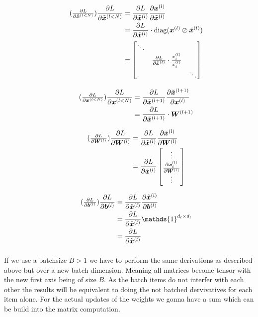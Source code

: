 \documentclass{article}
\newcommand\bM[1]{\ensuremath{\begin{bmatrix}#1\end{bmatrix}}}
\newcommand\·{\ensuremath{\cdot}}
\newcommand\…{\ensuremath{\dots}}
\renewcommand\t{\ensuremath{\times}}
\DeclareMathOperator{\diag}{diag}
\newcommand{\⇔}{\ensuremath{\Leftrightarrow}}
\newcommand{\⇐}{\ensuremath{\Leftarrow}}
\newcommand{\⇒}{\ensuremath{\Rightarrow}}
\newcommand\f[2]{\ensuremath{\frac{#1}{#2}}}
\newcommand\pf[2]{\ensuremath{\frac{\partial {#1}}{\partial {#2}}}}
\newcommand*{\B}[1]{\ifmmode\bm{#1}\else\textbf{#1}\fi}
\newcommand\1{\ensuremath{\mathds{1}}}
\newcommand\ℝ{\ensuremath{\mathds{R}}}
\begin{document}
\begin{align*}
  \tag{$\pf{L}{\tilde{\B{x}}^{(l<N)}}$}
  \pf{L}{\tilde{\B{x}}^{(l<N)}}
  &= \pf{L}{\tilde{\B{x}}^{(l)}}\pf{\B{x}^{(l)}}{\tilde{\B{x}}^{(l)}}\\
  &= \pf{L}{\tilde{\B{x}}^{(l)}}\·\diag(\B{x}^{(l)}\oslash\tilde{\B{x}}^{(l)})\\
  &= \bM{\ddots & &\\ & \pf{L}{\tilde{\B{x}}^{(l)}}\·\f{x^{(l)}_i}{\tilde{x}^{(l)}_i} &\\ & &\ddots}
\end{align*}

\begin{align*}
  \tag{$\pf{L}{\B{x}^{(l<N)}}$}
  \pf{L}{\B{x}^{(l<N)}}
  &= \pf{L}{\tilde{\B{x}}^{(l+1)}}\pf{\tilde{\B{x}}^{(l+1)}}{\B{x}^{(l)}}\\
  &= \pf{L}{\tilde{\B{x}}^{(l+1)}}\·\B{W}^{(l+1)}\\
\end{align*}

\begin{align*}
  \tag{$\pf{L}{\B{W}^{(l)}}$}
  \pf{L}{\B{W}^{(l)}}
  &= \pf{L}{\tilde{\B{x}}^{(l)}} \pf{\tilde{\B{x}}^{(l)}}{\B{W}^{(l)}}\\
  &= \pf{L}{\tilde{\B{x}}^{(l)}} \bM{\vdots\\\pf{\tilde{\B{x}}^{(l)}_i}{\B{W}^{(l)}}\\\vdots}
\end{align*}

\begin{align*}
  \tag{$\pf{L}{\B{b}^{(l)}}$}
  \pf{L}{\B{b}^{(l)}}
  &= \pf{L}{\tilde{\B{x}}^{(l)}}\pf{\tilde{\B{x}}^{(l)}}{\B{b}^{(l)}}\\
  &= \pf{L}{\tilde{\B{x}}^{(l)}}\1^{d_l\t d_l}\\
  &= \pf{L}{\tilde{\B{x}}^{(l)}}
\end{align*}

\subsubsection{}
If we use a batchsize $B>1$ we have to perform the same derivations as described above but over a new batch dimension.
Meaning all matrices become tensor with the new first axis being of size $B$.
As the batch items do not interfer with each other the results will be equivalent to doing the not batched dervivatives for each item alone.
For the actual updates of the weights we gonna have a sum which can be build into the matrix computation.
\end{document}
